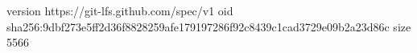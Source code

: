 version https://git-lfs.github.com/spec/v1
oid sha256:9dbf273e5ff2d36f8828259afe179197286f92c8439c1cad3729e09b2a23d86c
size 5566
